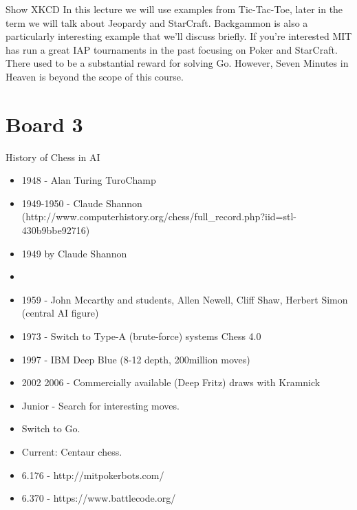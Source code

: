 \documentclass[11pt]{article}
\begin{document}
Show XKCD
\noindent In this lecture we will use examples from Tic-Tac-Toe, later in the term we will talk about Jeopardy and StarCraft. Backgammon is also a particularly interesting example that we'll discuss briefly. If you're interested MIT has run a great IAP tournaments in the past focusing on Poker and StarCraft. There used to be a substantial reward for solving Go. However, Seven Minutes in Heaven is beyond the scope of this course.

\section{Board 3}

History of Chess in AI
\begin{itemize}
\item 1948 - Alan Turing TuroChamp 
\item 1949-1950 - Claude Shannon
  (http://www.computerhistory.org/chess/full_record.php?iid=stl-430b9bbe92716)
\item 1949 by Claude Shannon 
\item 
\item 1959 - John Mccarthy and students, Allen
  Newell, Cliff Shaw, Herbert Simon (central AI figure)
\item 1973 - Switch to Type-A (brute-force) systems Chess 4.0

\item 1997 - IBM Deep Blue (8-12 depth, 200million moves)

\item 2002 2006 - Commercially available (Deep Fritz) draws with Kramnick
\item Junior - Search for interesting moves.

\item Switch to Go. 
\item Current: Centaur chess. 

\end{itemize}

 


\begin{itemize}
\item 6.176 - http://mitpokerbots.com/

\item 6.370 - https://www.battlecode.org/

\end{itemize}
\end{document}
